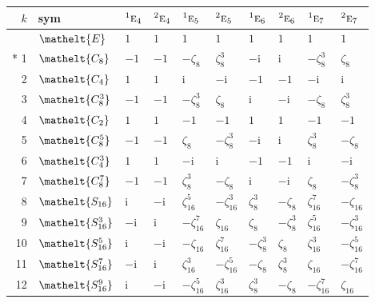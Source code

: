 \documentclass[10pt,a4paper]{article}
\numberwithin{equation}{section}
\newcommand{\eltfont}[1]{{\let\sigma\eltsigma\mathelt{#1}}}
\newcommand{\irr}[1]{\text{\normalfont\scshape #1}}
\newcommand{\conjpair}[1]{{}^{#1}}
\newcommand{\cls}[1]{\eltfont{#1}}
\newcommand{\iunit}{\mathrm{i}}
\newcommand{\rootunity}[1]{\zeta_{#1}}
\begin{document}
{\small\setlength{\tabcolsep}{4pt}
\begin{longtable}{@{}rlllllllll@{}}\toprule
$k$ & sym & $\conjpair{1}\irr{e}_{4}$ & $\conjpair{2}\irr{e}_{4}$ & $\conjpair{1}\irr{e}_{5}$ & $\conjpair{2}\irr{e}_{5}$ & $\conjpair{1}\irr{e}_{6}$ & $\conjpair{2}\irr{e}_{6}$ & $\conjpair{1}\irr{e}_{7}$ & $\conjpair{2}\irr{e}_{7}$\\\midrule\endhead
\bottomrule\endfoot\endlastfoot
0 & $\cls{E}$ & $1$ & $1$ & $1$ & $1$ & $1$ & $1$ & $1$ & $1$\\*
1 & $\cls{C_{8}}$ & $-1$ & $-1$ & $-\rootunity{8}$ & $\rootunity{8}^{3}$ & $-\iunit{}$ & $\iunit{}$ & $-\rootunity{8}^{3}$ & $\rootunity{8}$\\
2 & $\cls{C_{4}}$ & $1$ & $1$ & $\iunit{}$ & $-\iunit{}$ & $-1$ & $-1$ & $-\iunit{}$ & $\iunit{}$\\
3 & $\cls{C_{8}^{3}}$ & $-1$ & $-1$ & $-\rootunity{8}^{3}$ & $\rootunity{8}$ & $\iunit{}$ & $-\iunit{}$ & $-\rootunity{8}$ & $\rootunity{8}^{3}$\\
4 & $\cls{C_{2}}$ & $1$ & $1$ & $-1$ & $-1$ & $1$ & $1$ & $-1$ & $-1$\\
5 & $\cls{C_{8}^{5}}$ & $-1$ & $-1$ & $\rootunity{8}$ & $-\rootunity{8}^{3}$ & $-\iunit{}$ & $\iunit{}$ & $\rootunity{8}^{3}$ & $-\rootunity{8}$\\
6 & $\cls{C_{4}^{3}}$ & $1$ & $1$ & $-\iunit{}$ & $\iunit{}$ & $-1$ & $-1$ & $\iunit{}$ & $-\iunit{}$\\
7 & $\cls{C_{8}^{7}}$ & $-1$ & $-1$ & $\rootunity{8}^{3}$ & $-\rootunity{8}$ & $\iunit{}$ & $-\iunit{}$ & $\rootunity{8}$ & $-\rootunity{8}^{3}$\\
8 & $\cls{S_{16}}$ & $\iunit{}$ & $-\iunit{}$ & $\rootunity{16}^{5}$ & $-\rootunity{16}^{3}$ & $\rootunity{8}^{3}$ & $-\rootunity{8}$ & $\rootunity{16}^{7}$ & $-\rootunity{16}$\\
9 & $\cls{S_{16}^{3}}$ & $-\iunit{}$ & $\iunit{}$ & $-\rootunity{16}^{7}$ & $\rootunity{16}$ & $\rootunity{8}$ & $-\rootunity{8}^{3}$ & $\rootunity{16}^{5}$ & $-\rootunity{16}^{3}$\\
10 & $\cls{S_{16}^{5}}$ & $\iunit{}$ & $-\iunit{}$ & $-\rootunity{16}$ & $\rootunity{16}^{7}$ & $-\rootunity{8}^{3}$ & $\rootunity{8}$ & $\rootunity{16}^{3}$ & $-\rootunity{16}^{5}$\\
11 & $\cls{S_{16}^{7}}$ & $-\iunit{}$ & $\iunit{}$ & $\rootunity{16}^{3}$ & $-\rootunity{16}^{5}$ & $-\rootunity{8}$ & $\rootunity{8}^{3}$ & $\rootunity{16}$ & $-\rootunity{16}^{7}$\\
12 & $\cls{S_{16}^{9}}$ & $\iunit{}$ & $-\iunit{}$ & $-\rootunity{16}^{5}$ & $\rootunity{16}^{3}$ & $\rootunity{8}^{3}$ & $-\rootunity{8}$ & $-\rootunity{16}^{7}$ & $\rootunity{16}$\\

\end{longtable}}
\end{document}

